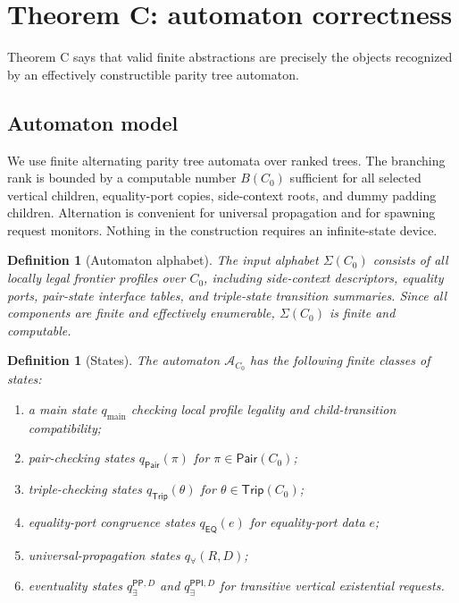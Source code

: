 \documentclass[11pt]{article}
\newtheorem{definition}[theorem]{Definition}
\newcommand{\EQ}{\mathsf{EQ}}
\newcommand{\PP}{\mathsf{PP}}
\newcommand{\PPI}{\mathsf{PPI}}
\newcommand{\Aut}{\mathcal A}
\newcommand{\Pair}{\mathsf{Pair}}
\newcommand{\Trip}{\mathsf{Trip}}
\begin{document}
\section{Theorem C: automaton correctness}

Theorem C says that valid finite abstractions are precisely the objects recognized by an effectively constructible parity tree automaton.

\subsection{Automaton model}

We use finite alternating parity tree automata over ranked trees.  The branching rank is bounded by a computable number $B(C_0)$ sufficient for all selected vertical children, equality-port copies, side-context roots, and dummy padding children.  Alternation is convenient for universal propagation and for spawning request monitors.  Nothing in the construction requires an infinite-state device.

\begin{definition}[Automaton alphabet]
The input alphabet $\Sigma(C_0)$ consists of all locally legal frontier profiles over $C_0$, including side-context descriptors, equality ports, pair-state interface tables, and triple-state transition summaries.  Since all components are finite and effectively enumerable, $\Sigma(C_0)$ is finite and computable.
\end{definition}

\begin{definition}[States]
The automaton $\Aut_{C_0}$ has the following finite classes of states:
\begin{enumerate}[label=(Q\arabic*)]
\item a main state $q_{\mathrm{main}}$ checking local profile legality and child-transition compatibility;
\item pair-checking states $q_{\Pair}(\pi)$ for $\pi\in\Pair(C_0)$;
\item triple-checking states $q_{\Trip}(\theta)$ for $\theta\in\Trip(C_0)$;
\item equality-port congruence states $q_{\EQ}(e)$ for equality-port data $e$;
\item universal-propagation states $q_{\forall}(R,D)$;
\item eventuality states $q_{\exists}^{\PP,D}$ and $q_{\exists}^{\PPI,D}$ for transitive vertical existential requests.
\end{enumerate}
\end{definition}
\end{document}
